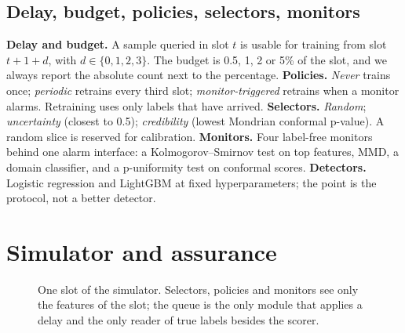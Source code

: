 \documentclass[conference,a4paper]{IEEEtran}
\begin{document}
\subsection{Delay, budget, policies, selectors, monitors}
\textbf{Delay and budget.} A sample queried in slot $t$ is usable for training from slot $t+1+d$, with $d\in\{0,1,2,3\}$. The budget is 0.5, 1, 2 or 5\% of the slot, and we always report the absolute count next to the percentage.
\textbf{Policies.} \emph{Never} trains once; \emph{periodic} retrains every third slot; \emph{monitor-triggered} retrains when a monitor alarms. Retraining uses only labels that have arrived.
\textbf{Selectors.} \emph{Random}; \emph{uncertainty} (closest to 0.5); \emph{credibility} (lowest Mondrian conformal p-value). A random slice is reserved for calibration.
\textbf{Monitors.} Four label-free monitors behind one alarm interface: a Kolmogorov--Smirnov test on top features, MMD, a domain classifier, and a p-uniformity test on conformal scores.
\textbf{Detectors.} Logistic regression and LightGBM at fixed hyperparameters; the point is the protocol, not a better detector.

\section{Simulator and assurance}
\begin{figure}[t]
\centering
{}
\caption{One slot of the simulator. Selectors, policies and monitors see only the features of the slot; the queue is the only module that applies a delay and the only reader of true labels besides the scorer.}
\label{fig:sim}
\end{figure}
\end{document}
